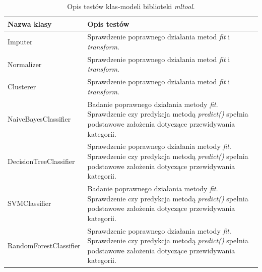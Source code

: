 \documentclass[../thesis.tex]{subfiles}
\begin{document}
\begin{table}[h]
\begin{center}
\begin{tabular}{ | l | p{110mm} | }
\hline
\rowcolor{lightgray} Nazwa klasy & Opis testów \\\hline

Imputer & Sprawdzenie poprawnego działania metod \emph{fit} i \emph{transform}.\\\hline
Normalizer & Sprawdzenie poprawnego działania metod \emph{fit} i \emph{transform}.\\\hline
Clusterer & Sprawdzenie poprawnego działania metod \emph{fit} i \emph{transform}.\\\hline
NaiveBayesClassifier & Badanie poprawnego działania metody \emph{fit}. Sprawdzenie czy predykcja metodą \emph{predict()} spełnia podstawowe założenia dotyczące przewidywania kategorii.\\\hline
DecisionTreeClassifier & Sprawdzenie poprawnego działania metody \emph{fit}. Sprawdzenie czy predykcja metodą \emph{predict()} spełnia podstawowe założenia dotyczące przewidywania kategorii.\\\hline
SVMClassifier & Badanie poprawnego działania metody \emph{fit}. Sprawdzenie czy predykcja metodą \emph{predict()} spełnia podstawowe założenia dotyczące przewidywania kategorii.\\\hline
RandomForestClassifier & Sprawdzenie poprawnego działania metody \emph{fit}. Sprawdzenie czy predykcja metodą \emph{predict()} spełnia podstawowe założenia dotyczące przewidywania kategorii.\\\hline

\end{tabular}
\caption{Opis testów klas-modeli biblioteki \emph{mltool}.}
\label{proj:table_mltool_models}
\end{center}
\end{table}
\end{document}
